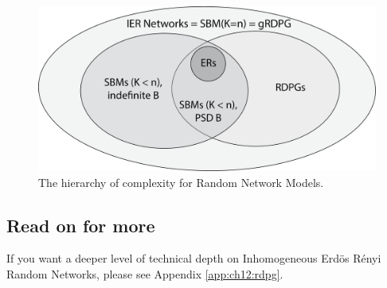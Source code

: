 \begin{figure}
    \centering
    \includegraphics[width=\linewidth]{representations/ch5/Images/unify_sn.png}
    \caption{The hierarchy of complexity for Random Network Models.}
    \label{fig:ch5:hierarchy}
\end{figure}

\subsection{Read on for more}

If you want a deeper level of technical depth on Inhomogeneous Erd\"os R\'enyi Random Networks, please see Appendix \ref{app:ch12:rdpg}.


\newpage
